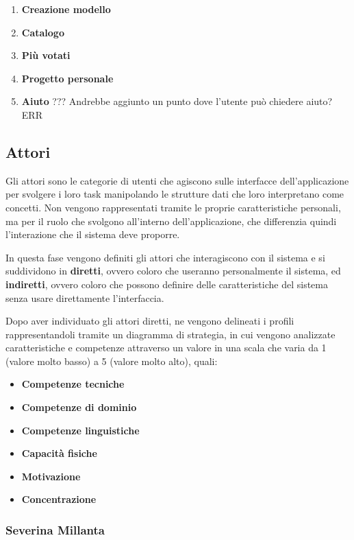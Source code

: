 \documentclass[12pt,italian,]{report}
\providecommand{\tightlist}{%
  \setlength{\itemsep}{0pt}\setlength{\parskip}{0pt}}
\begin{document}
\begin{enumerate}
\def\labelenumi{\arabic{enumi}.}
\tightlist
\item
  \textbf{Creazione modello}
\item
  \textbf{Catalogo}
\item
  \textbf{Più votati}
\item
  \textbf{Progetto personale}
\item
  \textbf{Aiuto} ??? Andrebbe aggiunto un punto dove l'utente può
  chiedere aiuto? ERR
\end{enumerate}

\hypertarget{attori}{%
\subsection{Attori}\label{attori}}

Gli attori sono le categorie di utenti che agiscono sulle interfacce
dell'applicazione per svolgere i loro task manipolando le strutture dati
che loro interpretano come concetti. Non vengono rappresentati tramite
le proprie caratteristiche personali, ma per il ruolo che svolgono
all'interno dell'applicazione, che differenzia quindi l'interazione che
il sistema deve proporre.

In questa fase vengono definiti gli attori che interagiscono con il
sistema e si suddividono in \textbf{diretti}​, ovvero coloro che
useranno personalmente il sistema, ed \textbf{indiretti​}, ovvero coloro
che possono definire delle caratteristiche del sistema senza usare
direttamente l'interfaccia.

Dopo aver individuato gli attori diretti, ne vengono delineati i profili
rappresentandoli tramite un​ diagramma di strategia​, in cui vengono
analizzate caratteristiche e competenze attraverso un valore in una
scala che varia da 1 (valore molto basso) a 5 (valore molto alto),
quali:

\begin{itemize}
\tightlist
\item
  \textbf{Competenze tecniche}
\item
  \textbf{Competenze di dominio}
\item
  \textbf{Competenze linguistiche}
\item
  \textbf{Capacità fisiche}
\item
  \textbf{Motivazione}
\item
  \textbf{Concentrazione}
\end{itemize}

\hypertarget{severina-millanta-1}{%
\subsubsection{Severina Millanta}\label{severina-millanta-1}}
\end{document}
